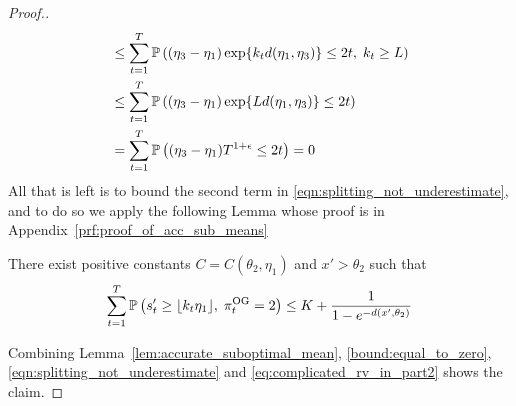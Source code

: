 \begin{proof}[Proof.]
\begin{align}
	& \le  \sum_{t=1}^T\mathbb{P} \left(   (\eta_3-\eta_1) \exp\{k_t d(\eta_1,\eta_3) \} \le 2t,\; k_t \ge L \right) \nonumber \\
	& \le  \sum_{t=1}^T\mathbb{P} \left(   (\eta_3-\eta_1) \exp\{L d(\eta_1,\eta_3) \} \le 2t \right) \nonumber \\
	& =   \sum_{t=1}^T\mathbb{P} \left(   (\eta_3-\eta_1) T^{1+\epsilon} \le 2t \right) = 0 \label{bound:equal_to_zero}
	\end{align}
	All that is left is to bound the second term in \eqref{eqn:splitting_not_underestimate}, and to do so we apply the following Lemma whose proof is in Appendix~\ref{prf:proof_of_acc_sub_means}
	\begin{lemma} \label{lem:accurate_suboptimal_mean}
		There exist positive constants $C = C(\theta_2,\eta_1)$ and $x' > \theta_2$ such that
		\begin{equation*}
		\sum_{t=1}^T \mathbb{P} \left( s'_t \ge \lfloor k_t \eta_1\rfloor, \; \pi^{\rm OG}_t = 2 \right) \le  K + \frac{1}{1 - e^{-d(x',\theta_2)}} 
		\end{equation*}
	\end{lemma}
	Combining Lemma~\ref{lem:accurate_suboptimal_mean}, \eqref{bound:equal_to_zero}, \eqref{eqn:splitting_not_underestimate} and \eqref{eq:complicated_rv_in_part2} shows the claim.
\end{proof}

